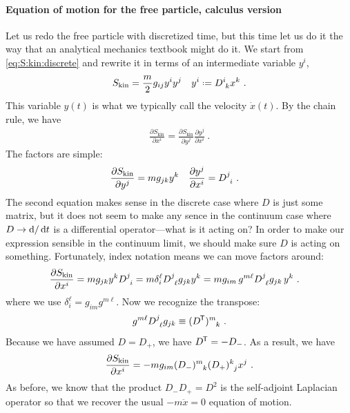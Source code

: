 \paragraph{Equation of motion for the free particle, calculus version}
Let us redo the free particle with discretized time, but this time let us do it the way that an analytical mechanics textbook might do it. We start from \eqref{eq:S:kin:discrete} and rewrite it in terms of an intermediate variable $y^i$,
\begin{align}
    S_\text{kin} &= \frac{m}{2}g_{ij} y^i y^j
    &
    y^i\defeq D\aij{i}{k} x^k \ .
\end{align}
This variable $y(t)$ is what we typically call the velocity $\dot x(t)$. By the chain rule, we have
\begin{align}
    \frac{ \partial S_\text{kin} }{ \partial x^i }
    =
    \frac{ \partial S_\text{kin} }{ \partial y^j }
    \frac{ \partial y^j }{ \partial x^i } \ .
\end{align}
The factors are simple:
\begin{align}
    \frac{ \partial S_\text{kin} }{ \partial y^j }
    &= m g_{jk} y^k
    &
    \frac{ \partial y^j }{ \partial x^i }
    &=
    D\aij{j}{i}
    \ .
\end{align}
The second equation makes sense in the discrete case where $D$ is just some matrix, but it does not seem to make any sence in the continuum case where $D\to \operatorname{d}\mkern-3mu^{}\mkern-1mu{}/\operatorname{d}\mkern-3mu^{}\mkern-1mu{t}$ is a differential operator---what is it acting on? In order to make our expression sensible in the continuum limit, we should make sure $D$ is acting on something. Fortunately, index notation means we can move factors around:
\begin{align}
    \frac{ \partial S_\text{kin} }{ \partial x^i }
    &=
    m g_{jk} y^k
    D\aij{j}{i}
    =
    m 
    \delta^\ell_i
    D\aij{j}{\ell} g_{jk} y^k
    = 
    m g_{im}\, g^{m\ell} D\aij{j}{\ell} g_{jk} \, y^k \ .
\end{align}
where we use $\delta^\ell_i = g_{im} g^{m\ell}$. Now we recognize the transpose: 
\begin{align}
    g^{m\ell} D\aij{j}{\ell} g_{jk} \equiv (D^\trans)\aij{m}{k}
    \ .
\end{align}
Because we have assumed $D=D_+$, we  have $D^{\mkern-1.5mu\mathsf{T}} = - D_-$. As a result, we have
\begin{align}
    \frac{ \partial S_\text{kin} }{ \partial x^i }
    = - m g_{im} (D_-)\aij{m}{k} (D_+)\aij{k}{j} x^j \ .
\end{align}
As before, we know that the product $D_-D_+ = D^2$ is the self-adjoint Laplacian operator so that we recover the usual $-m\ddot{x} = 0$ equation of motion. 

